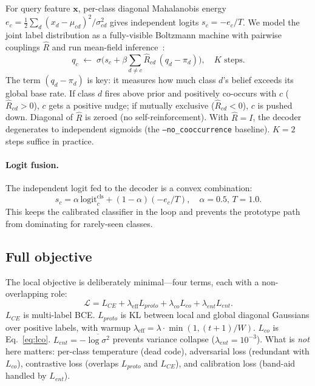 \documentclass[10pt,twocolumn,letterpaper]{article}
\theoremstyle{definition}
\newcommand{\Rhat}{\widehat{R}}
\begin{document}
For query feature $\mathbf{x}$, per-class diagonal Mahalanobis energy $e_c{=}\tfrac12\sum_d (x_d-\mu_{cd})^{2}/\sigma_{cd}^{2}$ gives independent logits $s_c{=}{-}e_c/T$. We model the joint label distribution as a fully-visible Boltzmann machine with pairwise couplings $\Rhat$ and run mean-field inference~\cite{wainwright2008variational}:
\begin{equation}
q_c\;\leftarrow\;\sigma\!\Big(s_c+\beta\sum_{d\neq c}\Rhat_{cd}\,(q_d-\pi_d)\Big),\quad K\text{ steps.}
\label{eq:meanfield}
\end{equation}
The term $(q_d-\pi_d)$ is key: it measures how much class $d$'s belief exceeds its global base rate. If class $d$ fires above prior and positively co-occurs with $c$ ($\Rhat_{cd}{>}0$), $c$ gets a positive nudge; if mutually exclusive ($\Rhat_{cd}{<}0$), $c$ is pushed down. Diagonal of $\Rhat$ is zeroed (no self-reinforcement). With $\Rhat{=}I$, the decoder degenerates to independent sigmoids (the \texttt{--no\_cooccurrence} baseline). $K{=}2$ steps suffice in practice.

\paragraph{Logit fusion.} The independent logit fed to the decoder is a convex combination:
\begin{equation}
s_c=\alpha\,\mathrm{logit}_c^{\mathrm{cls}}+(1-\alpha)(-e_c/T),\quad \alpha{=}0.5,\,T{=}1.0.
\label{eq:fusion}
\end{equation}
This keeps the calibrated classifier in the loop and prevents the prototype path from dominating for rarely-seen classes.

\subsection{Full objective}
\label{sec:objective}

The local objective is deliberately minimal---four terms, each with a non-overlapping role:
\begin{equation}
\mathcal{L}=L_{CE}+\lambda_{\text{eff}}L_{proto}+\lambda_{co}L_{co}+\lambda_{ent}L_{ent}.
\label{eq:objective}
\end{equation}
$L_{CE}$ is multi-label BCE. $L_{proto}$ is KL between local and global diagonal Gaussians over positive labels, with warmup $\lambda_{\text{eff}}{=}\lambda{\cdot}\min(1,(t{+}1)/W)$. $L_{co}$ is Eq.~\eqref{eq:lco}. $L_{ent}{=}{-}\overline{\log\sigma^{2}}$ prevents variance collapse ($\lambda_{ent}{=}10^{-3}$). What is \emph{not} here matters: per-class temperature (dead code), adversarial loss (redundant with $L_{co}$), contrastive loss (overlaps $L_{proto}$ and $L_{CE}$), and calibration loss (band-aid handled by $L_{ent}$).
\end{document}

